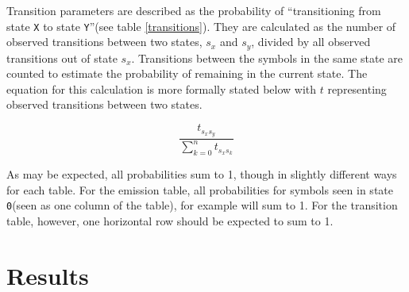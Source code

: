 \documentclass{article}
\begin{document}
Transition parameters are described as the probability of ``transitioning from state \verb+X+ to state \verb+Y+''(see table \ref{transitions}). They are calculated as the number of observed transitions between two states, $s_x$ and $s_y$, divided by all observed transitions out of state $s_x$. Transitions between the symbols in the same state are counted to estimate the probability of remaining in the current state. The equation for this calculation is more formally stated below with $t$ representing observed transitions between two states.

\begin{equation}
    \frac{t_{s_{x}s_{y}}}{\sum_{k = 0}^{n} t_{s_{x}s_{k}}}
\end{equation}

As may be expected, all probabilities sum to 1, though in slightly different ways for each table. For the emission table, all probabilities for symbols seen in state \verb+0+(seen as one column of the table), for example will sum to 1. For the transition table, however, one horizontal row should be expected to sum to 1.

\section{Results}
\end{document}
